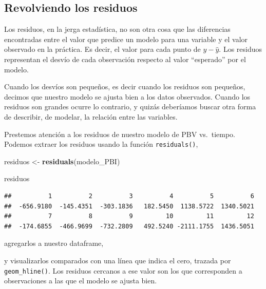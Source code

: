 \documentclass[]{book}
\newenvironment{Shaded}{\begin{snugshade}}{\end{snugshade}}
\newcommand{\KeywordTok}[1]{\textcolor[rgb]{0.13,0.29,0.53}{\textbf{#1}}}
\newcommand{\DataTypeTok}[1]{\textcolor[rgb]{0.13,0.29,0.53}{#1}}
\newcommand{\StringTok}[1]{\textcolor[rgb]{0.31,0.60,0.02}{#1}}
\newcommand{\OperatorTok}[1]{\textcolor[rgb]{0.81,0.36,0.00}{\textbf{#1}}}
\newcommand{\NormalTok}[1]{#1}
\begin{document}
\subsection{Revolviendo los residuos}\label{revolviendo-los-residuos}

Los residuos, en la jerga estadística, no son otra cosa que las
diferencias encontradas entre el valor que predice un modelo para una
variable y el valor observado en la práctica. Es decir, el valor para
cada punto de \(y - \widehat{y}\). Los residuos representan el desvío de
cada observación respecto al valor ``esperado'' por el modelo.

Cuando los desvíos son pequeños, es decir cuando los residuos son
pequeños, decimos que nuestro modelo se ajusta bien a los datos
observados. Cuando los residuos son grandes ocurre lo contrario, y
quizás deberíamos buscar otra forma de describir, de modelar, la
relación entre las variables.

Prestemos atención a los residuos de nuestro modelo de PBV vs.~tiempo.
Podemos extraer los residuos usando la función \texttt{residuals()},

\begin{Shaded}
\begin{Highlighting}[]
\NormalTok{residuos <-}\StringTok{ }\KeywordTok{residuals}\NormalTok{(modelo_PBI)}

\NormalTok{residuos}
\end{Highlighting}
\end{Shaded}

\begin{verbatim}
##          1          2          3          4          5          6 
##  -656.9180  -145.4351  -303.1836   182.5450  1138.5722  1340.5021 
##          7          8          9         10         11         12 
##  -174.6855  -466.9699  -732.2809   492.5240 -2111.1755  1436.5051
\end{verbatim}

agregarlos a nuestro dataframe,

\begin{Shaded}
\end{Shaded}

y visualizarlos comparados con una línea que indica el cero, trazada por
\texttt{geom\_hline()}. Los residuos cercanos a ese valor son los que
corresponden a observaciones a las que el modelo se ajusta bien.
\end{document}
